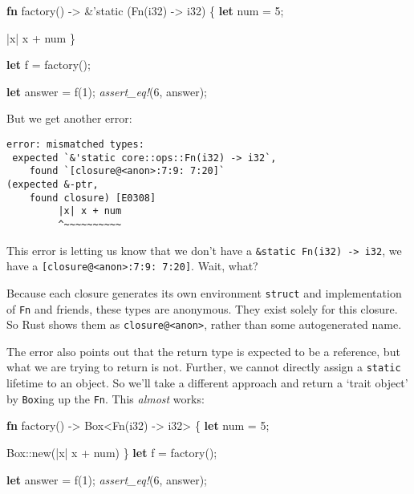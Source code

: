 \documentclass[a4paper,]{book}
\newenvironment{Shaded}{\begin{snugshade}}{\end{snugshade}}
\newcommand{\KeywordTok}[1]{\textcolor[rgb]{0.13,0.29,0.53}{\textbf{{#1}}}}
\newcommand{\DataTypeTok}[1]{\textcolor[rgb]{0.13,0.29,0.53}{{#1}}}
\newcommand{\DecValTok}[1]{\textcolor[rgb]{0.00,0.00,0.81}{{#1}}}
\newcommand{\OtherTok}[1]{\textcolor[rgb]{0.56,0.35,0.01}{{#1}}}
\newcommand{\BuiltInTok}[1]{{#1}}
\newcommand{\PreprocessorTok}[1]{\textcolor[rgb]{0.56,0.35,0.01}{\textit{{#1}}}}
\newcommand{\NormalTok}[1]{{#1}}
\begin{document}
\begin{Shaded}
\begin{Highlighting}[]
\KeywordTok{fn} \NormalTok{factory() -> &}\OtherTok{'static} \NormalTok{(}\BuiltInTok{Fn}\NormalTok{(}\DataTypeTok{i32}\NormalTok{) -> }\DataTypeTok{i32}\NormalTok{) \{}
    \KeywordTok{let} \NormalTok{num = }\DecValTok{5}\NormalTok{;}

    \NormalTok{|x| x + num}
\NormalTok{\}}

\KeywordTok{let} \NormalTok{f = factory();}

\KeywordTok{let} \NormalTok{answer = f(}\DecValTok{1}\NormalTok{);}
\PreprocessorTok{assert_eq!}\NormalTok{(}\DecValTok{6}\NormalTok{, answer);}
\end{Highlighting}
\end{Shaded}

But we get another error:

\begin{verbatim}
error: mismatched types:
 expected `&'static core::ops::Fn(i32) -> i32`,
    found `[closure@<anon>:7:9: 7:20]`
(expected &-ptr,
    found closure) [E0308]
         |x| x + num
         ^~~~~~~~~~~
\end{verbatim}

This error is letting us know that we don't have a
\texttt{\&\textquotesingle{}static\ Fn(i32)\ -\textgreater{}\ i32}, we
have a \texttt{{[}closure@\textless{}anon\textgreater{}:7:9:\ 7:20{]}}.
Wait, what?

Because each closure generates its own environment \texttt{struct} and
implementation of \texttt{Fn} and friends, these types are anonymous.
They exist solely for this closure. So Rust shows them as
\texttt{closure@\textless{}anon\textgreater{}}, rather than some
autogenerated name.

The error also points out that the return type is expected to be a
reference, but what we are trying to return is not. Further, we cannot
directly assign a \texttt{\textquotesingle{}static} lifetime to an
object. So we'll take a different approach and return a `trait object'
by \texttt{Box}ing up the \texttt{Fn}. This \emph{almost} works:

\begin{Shaded}
\begin{Highlighting}[]
\KeywordTok{fn} \NormalTok{factory() -> }\DataTypeTok{Box}\NormalTok{<}\BuiltInTok{Fn}\NormalTok{(}\DataTypeTok{i32}\NormalTok{) -> }\DataTypeTok{i32}\NormalTok{> \{}
    \KeywordTok{let} \NormalTok{num = }\DecValTok{5}\NormalTok{;}

    \DataTypeTok{Box}\NormalTok{::new(|x| x + num)}
\NormalTok{\}}
\KeywordTok{let} \NormalTok{f = factory();}

\KeywordTok{let} \NormalTok{answer = f(}\DecValTok{1}\NormalTok{);}
\PreprocessorTok{assert_eq!}\NormalTok{(}\DecValTok{6}\NormalTok{, answer);}
\end{Highlighting}
\end{Shaded}
\end{document}

